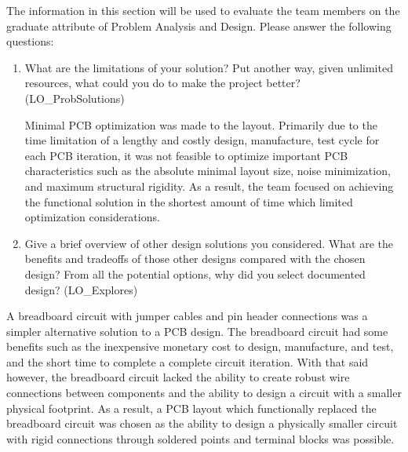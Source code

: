 \documentclass[12pt, titlepage]{article}
\begin{document}
The information in this section will be used to evaluate the team members on the
graduate attribute of Problem Analysis and Design.  Please answer the following questions:

\begin{enumerate}
  \item What are the limitations of your solution?  Put another way, given
  unlimited resources, what could you do to make the project better? (LO\_ProbSolutions)

  Minimal PCB optimization was made to the layout. Primarily due to the time limitation of a lengthy and costly design, manufacture, test cycle for each PCB iteration, it was not feasible to optimize important PCB characteristics such as the absolute minimal layout size, noise minimization, and maximum structural rigidity. As a result, the team focused on achieving the functional solution in the shortest amount of time which limited optimization considerations. \\

  \item Give a brief overview of other design solutions you considered.  What
  are the benefits and tradeoffs of those other designs compared with the chosen
  design?  From all the potential options, why did you select documented design?
  (LO\_Explores)
\end{enumerate}
  A breadboard circuit with jumper cables and pin header connections was a simpler alternative solution to a PCB design. The breadboard circuit had some benefits such as the inexpensive monetary cost to design, manufacture, and test, and the short time to complete a complete circuit iteration. With that said however, the breadboard circuit lacked the ability to create robust wire connections between components and the ability to design a circuit with a smaller physical footprint. As a result, a PCB layout which functionally replaced the breadboard circuit was chosen as the ability to design a physically smaller circuit with rigid connections through soldered points and terminal blocks was possible. \\
\end{document}
